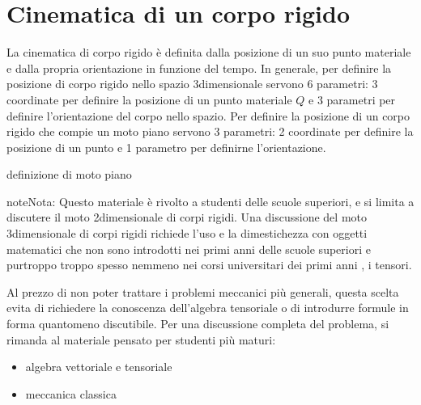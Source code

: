 \documentclass[letterpaper,10pt,italian]{jupyterBook}
\begin{document}
\section{Cinematica di un corpo rigido}
\label{\detokenize{ch/mechanics/kinematics-rigid:cinematica-di-un-corpo-rigido}}\label{\detokenize{ch/mechanics/kinematics-rigid:physics-hs-mechanics-kinematics-rigid}}\label{\detokenize{ch/mechanics/kinematics-rigid::doc}}
\sphinxAtStartPar
La cinematica di corpo rigido è definita dalla posizione di un suo punto materiale e dalla propria orientazione in funzione del tempo. In generale, per definire la posizione di corpo rigido nello spazio 3\sphinxhyphen{}dimensionale servono 6 parametri: 3 coordinate per definire la posizione di un punto materiale \(Q\) e 3 parametri per definire l’orientazione del corpo nello spazio. Per definire la posizione di un corpo rigido che compie un moto piano servono 3 parametri: 2 coordinate per definire la posizione di un punto e 1 parametro per definirne l’orientazione.

\sphinxAtStartPar
{} definizione di moto piano

\begin{sphinxadmonition}{note}{Nota:}
\sphinxAtStartPar
Questo materiale è rivolto a studenti delle scuole superiori, e si limita a discutere il moto 2\sphinxhyphen{}dimensionale di corpi rigidi. Una discussione del moto 3\sphinxhyphen{}dimensionale di corpi rigidi richiede l’uso e la dimestichezza con oggetti matematici che non sono introdotti nei primi anni delle scuole superiori \sphinxhyphen{} e purtroppo troppo spesso nemmeno nei corsi universitari dei primi anni \sphinxhyphen{}, i tensori.

\sphinxAtStartPar
Al prezzo di non poter trattare i problemi meccanici più generali, questa scelta evita di richiedere la conoscenza dell’algebra tensoriale o di introdurre formule in forma quantomeno discutibile. Per una discussione completa del problema, si rimanda al materiale pensato per studenti più maturi: 
\begin{itemize}
\item {} 
\sphinxAtStartPar
algebra vettoriale e tensoriale 

\item {} 
\sphinxAtStartPar
meccanica classica 

\end{itemize}
\end{sphinxadmonition}
\end{document}
